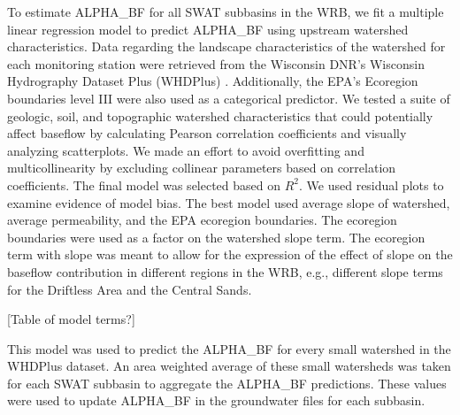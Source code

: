 	To estimate ALPHA\_BF for all SWAT subbasins in the WRB, we fit a multiple linear regression model to predict ALPHA\_BF using upstream watershed characteristics. Data regarding the landscape characteristics of the watershed for each monitoring station were retrieved from the Wisconsin DNR's Wisconsin Hydrography Dataset Plus (WHDPlus) \citep{wdnr_whdplus_2013}. Additionally, the EPA's Ecoregion boundaries level III were also used as a categorical predictor. We tested a suite of geologic, soil, and topographic watershed characteristics that could potentially affect baseflow by calculating Pearson correlation coefficients and visually analyzing scatterplots. We made an effort to avoid overfitting and multicollinearity by excluding collinear parameters based on correlation coefficients. The final model was selected based on $R^2$. We used residual plots to examine evidence of model bias. The best model used average slope of watershed, average permeability, and the EPA ecoregion boundaries. The ecoregion boundaries were used as a factor on the watershed slope term. The ecoregion term with slope was meant to allow for the expression of the effect of slope on the baseflow contribution in different regions in the WRB, e.g., different slope terms for the Driftless Area and the Central Sands.
	
	[Table of model terms?]
	
	This model was used to predict the ALPHA\_BF for every small watershed in the WHDPlus dataset. An area weighted average of these small watersheds was taken for each SWAT subbasin to aggregate the ALPHA\_BF predictions. These values were used to update ALPHA\_BF in the groundwater files for each subbasin.